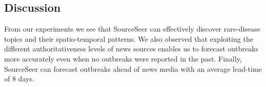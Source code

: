 \documentclass[twoside,leqno,twocolumn]{article}
\newcommand{\fullmodel}{{{\sf SourceSeer}}\xspace}
\newcommand{\locationmodel}{{\sf LocSeer}\xspace}
\newcommand{\keymodel}{{\sf KeyWord}\xspace}
\begin{document}
\vspace{-10pt}
\subsection{Discussion}
From our experiments we see that \fullmodel can effectively discover rare-disease topics and their spatio-temporal patterns. We also observed that exploiting the different authoritativeness levels of news sources enables us to forecast outbreaks more accurately even when no outbreaks were reported in the past. Finally, \fullmodel can forecast outbreaks ahead of news media with an average lead-time of 8 days.
\vspace{-10pt}
%
\end{document}
